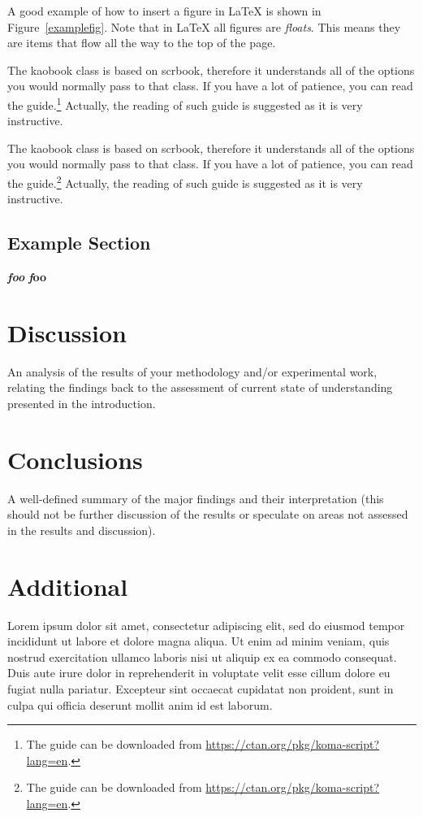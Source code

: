 \documentclass[12pt, letterpaper]{memoir}
\newcommand{\figref}[1]{Figure~\ref{#1}}
\begin{document}
A good example of how to insert a figure in \LaTeX{} is shown in \figref{examplefig}. Note that in \LaTeX{} all figures are \emph{floats}. This means they are items that flow all the way to the top of the page.

The kaobook class is based on scrbook, therefore it 
understands all of the options you would normally pass to that class. If 
you have a lot of patience, you can read the guide.\footnote{The guide can be downloaded from 
\url{https://ctan.org/pkg/koma-script?lang=en}.} Actually, the reading 
of such guide is suggested as it is very instructive.

The kaobook class is based on scrbook, therefore it 
understands all of the options you would normally pass to that class. If 
you have a lot of patience, you can read the guide.\footnote{The guide can be downloaded from 
\url{https://ctan.org/pkg/koma-script?lang=en}.} Actually, the reading 
of such guide is suggested as it is very instructive.


\section{Example Section}

 {\bfseries\slshape foo}  {\small \bfseries\textit foo}



\chapter{Discussion}
An analysis of the results of your methodology and/or experimental work, relating the findings back to the assessment of current state of understanding presented in the introduction.


\chapter{Conclusions}
A well-defined summary of the major findings and their interpretation (this should not be further discussion of the results or speculate on areas not assessed in the results and discussion).



\appendix

\chapter{Additional}
Lorem ipsum dolor sit amet, consectetur adipiscing elit, sed do eiusmod tempor incididunt ut labore et dolore magna aliqua. Ut enim ad minim veniam, quis nostrud exercitation ullamco laboris nisi ut aliquip ex ea commodo consequat. Duis aute irure dolor in reprehenderit in voluptate velit esse cillum dolore eu fugiat nulla pariatur. Excepteur sint occaecat cupidatat non proident, sunt in culpa qui officia deserunt mollit anim id est laborum. \citep{hk}






\end{document}
